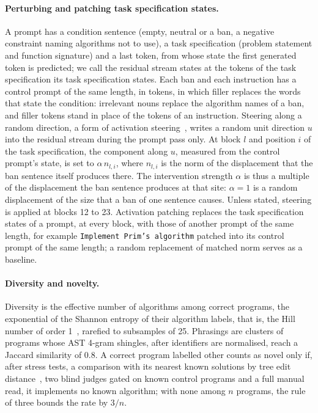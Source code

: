 \documentclass[11pt,letterpaper]{article}
\begin{document}
\paragraph{Perturbing and patching task specification states.}
A prompt has a condition sentence (empty, neutral or a ban, a negative constraint naming algorithms not to use), a task specification (problem statement and function signature) and a last token, from whose state the first generated token is predicted; we call the residual stream states at the tokens of the task specification its task specification states. Each ban and each instruction has a control prompt of the same length, in tokens, in which filler replaces the words that state the condition: irrelevant nouns replace the algorithm names of a ban, and filler tokens stand in place of the tokens of an instruction. Steering along a random direction, a form of activation steering~\citep{Rimsky2024}, writes a random unit direction $u$ into the residual stream during the prompt pass only. At block $l$ and position $i$ of the task specification, the component along $u$, measured from the control prompt's state, is set to $\alpha\, n_{l,i}$, where $n_{l,i}$ is the norm of the displacement that the ban sentence itself produces there. The intervention strength $\alpha$ is thus a multiple of the displacement the ban sentence produces at that site: $\alpha = 1$ is a random displacement of the size that a ban of one sentence causes. Unless stated, steering is applied at blocks 12 to 23. Activation patching replaces the task specification states of a prompt, at every block, with those of another prompt of the same length, for example \texttt{Implement Prim's algorithm} patched into its control prompt of the same length; a random replacement of matched norm serves as a baseline.

\paragraph{Diversity and novelty.}
Diversity is the effective number of algorithms among correct programs, the exponential of the Shannon entropy of their algorithm labels, that is, the Hill number of order 1~\citep{Hill1973}, rarefied to subsamples of 25. Phrasings are clusters of programs whose AST 4-gram shingles, after identifiers are normalised, reach a Jaccard similarity of 0.8. A correct program labelled other counts as novel only if, after stress tests, a comparison with its nearest known solutions by tree edit distance~\citep{Zhang1989}, two blind judges gated on known control programs and a full manual read, it implements no known algorithm; with none among $n$ programs, the rule of three bounds the rate by $3/n$.
\end{document}
